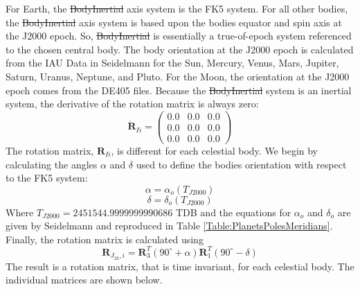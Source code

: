 {For Earth, the \st{BodyInertial} axis system is the FK5 system.  For
all other bodies, the \st{BodyInertial} axis system is based upon
the bodies equator and spin axis at the J2000 epoch. So,
\st{BodyInertial} is essentially a true-of-epoch system referenced
to the chosen central body.  The body orientation at the J2000 epoch
is calculated from the IAU Data in Seidelmann
\cite{Seidelmann:etal:02} for the Sun, Mercury, Venus, Mars,
Jupiter, Saturn, Uranus, Neptune, and Pluto.  For the Moon, the
orientation at the J2000 epoch comes from the DE405 files.  Because
the \st{BodyInertial} system is an inertial system, the derivative
of the rotation matrix is always zero:
%
\begin{equation}
   \dot{\mathbf{R}}_{Ii}  = \begin{pmatrix}
     0.0 & 0.0 & 0.0\\
     0.0 & 0.0 & 0.0\\
     0.0 & 0.0 & 0.0
     \end{pmatrix}
\end{equation}
%
The rotation matrix, $\mathbf{R}_{Ii}$, is different for each
celestial body.  We begin by calculating the angles $\alpha$ and
$\delta$ used to define the bodies orientation with respect to the
FK5 system:
%
\begin{equation}
    \alpha = \alpha_o(T_{J2000})
\end{equation}
%
\begin{equation}
    \delta = \delta_o(T_{J2000})
\end{equation}
%
Where $T_{J2000} = 2451544.9999999990686$ TDB and the equations for
$\alpha_o$ and $\delta_o$ are given by Seidelmann
\cite{Seidelmann:etal:02} and reproduced in Table
\ref{Table:PlanetsPolesMeridians}. Finally, the rotation matrix is
calculated using
%
\begin{equation}
     \mathbf{R}_{J_{2k},i} = \mathbf{R}_3^{T}(90^{\circ} + \alpha)
     \mathbf{R}_1^{T}(90^{\circ}- \delta) \label{Eq:BodyEquatorR}
\end{equation}
%
The result is a rotation matrix, that is time invariant, for each
celestial body.  The individual matrices are shown below.

}
